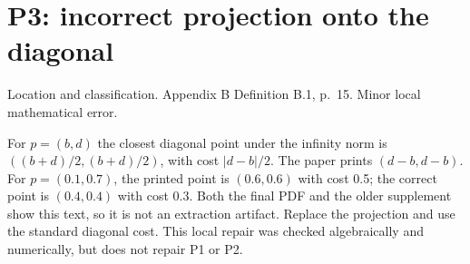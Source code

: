 \documentclass[10pt]{article}
\begin{document}
\section*{P3: incorrect projection onto the diagonal}
Location and classification. Appendix B Definition B.1, p. 15. Minor local mathematical error.\par
For \(p=(b,d)\) the closest diagonal point under the infinity norm is \(((b+d)/2,(b+d)/2)\), with cost \(|d-b|/2\). The paper prints \((d-b,d-b)\). For \(p=(0.1,0.7)\), the printed point is \((0.6,0.6)\) with cost 0.5; the correct point is \((0.4,0.4)\) with cost 0.3. Both the final PDF and the older supplement show this text, so it is not an extraction artifact. Replace the projection and use the standard diagonal cost. This local repair was checked algebraically and numerically, but does not repair P1 or P2.\par
\end{document}
